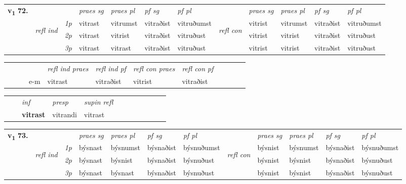 \begin{tabular}{llllllllllll} \toprule
\multirow{4}{*}{{{\textbf{v{\textsubscript{1}}} \Large{\textbf{72.}}}}}  & &   &  \textit{praes sg}  & \textit{praes pl}  &\textit{pf sg} & \textit{pf pl} &  &  \textit{praes sg}  & \textit{praes pl}  & \textit{pf sg} & \textit{pf pl } \\*
	\cmidrule{4-7} \cmidrule{9-12}
 &\multirow{3}{*}{\begin{turn}{90}\textit{refl ind}\end{turn}} & {\textit{1p}} & vitrast & vitrumst    & vitraðist & vitruðumst & \multirow{3}{*}{\begin{turn}{90}\textit{refl con}\end{turn}}  &vitrist & vitrumst & vitraðist & vitruðumst\\*
 &&  {\textit{2p}} &  vitrast  & vitrist   & vitraðist & vitruðust & &vitrist & vitrist & vitraðist & vitruðust \\*
& &  {\textit{3p}} & vitrast & vitrast   & vitraðist & vitruðust & & vitrist & vitrist& vitraðist & vitruðust  \\*
\cmidrule{4-7} \cmidrule{9-12}
\end{tabular}


\begin{tabular}{llllllllllll}
 & &  & &  \textit{refl ind praes} & \textit{refl ind pf} & \textit{refl con praes} & \textit{refl con pf} \\*
&  & & e-m & vitrast & vitraðist & vitrist & vitraðist \\*
\cmidrule{5-9}
\end{tabular}


\begin{tabular}{llllllllllll}
 & & \textit{inf}     & \textit{presp}  & \textit{supin refl}      \\*
  & & \textbf{vitrast}      & vitrandi  & vitrast  \\*
\cmidrule{1-12}
\end{tabular}



\begin{tabular}{llllllllllll} \toprule
\multirow{4}{*}{{{\textbf{v{\textsubscript{1}}} \Large{\textbf{73.}}}}}  & &   &  \textit{praes sg}  & \textit{praes pl}  &\textit{pf sg} & \textit{pf pl} &  &  \textit{praes sg}  & \textit{praes pl}  & \textit{pf sg} & \textit{pf pl } \\*
	\cmidrule{4-7} \cmidrule{9-12}
 &\multirow{3}{*}{\begin{turn}{90}\textit{refl ind}\end{turn}} & {\textit{1p}} & býsnast & býsnumst    & býsnaðist & býsnuðumst & \multirow{3}{*}{\begin{turn}{90}\textit{refl con}\end{turn}}  &býsnist & býsnumst & býsnaðist & býsnuðumst\\*
 &&  {\textit{2p}} &  býsnast  & býsnist   & býsnaðist & býsnuðust & &býsnist & býsnist & býsnaðist & býsnuðust \\*
& &  {\textit{3p}} & býsnast & býsnast   & býsnaðist & býsnuðust & & býsnist & býsnist& býsnaðist & býsnuðust  \\*
\cmidrule{4-7} \cmidrule{9-12}
\end{tabular}


